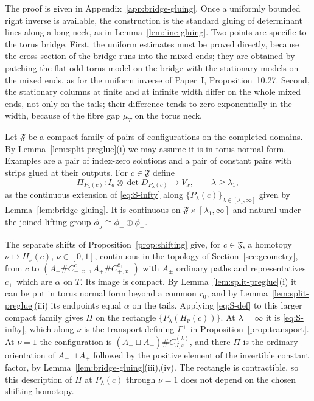 \documentclass[11pt]{amsart}
\theoremstyle{definition}
\theoremstyle{remark}
\theoremstyle{plain}
\numberwithin{equation}{section}
\begin{document}
The proof is given in Appendix~\ref{app:bridge-gluing}. Once a uniformly
bounded right inverse is available, the construction is the standard
gluing of determinant lines along a long neck, as in
Lemma~\ref{lem:line-gluing}. Two points are specific to the torus bridge.
First, the uniform estimates must be proved directly, because the
cross-section of the bridge runs into the mixed ends; they are obtained by
patching the flat odd-torus model on the bridge with the stationary models
on the mixed ends, as for the uniform inverse of Paper~I,
Proposition~10.27. Second, the stationary columns at finite and at infinite
width differ on the whole mixed ends, not only on the tails; their
difference tends to zero exponentially in the width, because of the fibre
gap $\mu_T$ on the torus neck.

Let $\mathfrak F$ be a compact family of pairs of configurations on the
completed domains. By Lemma~\ref{lem:split-preglue}(i) we may assume it
is in torus normal form. Examples are a pair of index-zero solutions
and a pair of constant pairs with strips glued at their outputs. For
$c\in\mathfrak F$ define
\begin{equation}\label{eq:S-def}
 \Pi_{P_\lambda(c)}:I_a\otimes\det D_{P_\lambda(c)}\longrightarrow V_x ,
 \qquad\lambda\ge\lambda_1,
\end{equation}
as the continuous extension of \eqref{eq:S-infty} along
$\{P_\lambda(c)\}_{\lambda\in[\lambda_1,\infty]}$ given by
Lemma~\ref{lem:bridge-gluing}. It is continuous on
$\mathfrak F\times[\lambda_1,\infty]$ and natural under the joined lifting
group $\phi_J\cong\phi_-\oplus\phi_+$.

The separate shifts of Proposition~\ref{prop:shifting} give, for
$c\in\mathfrak F$, a homotopy $\nu\mapsto H_\nu(c)$, $\nu\in[0,1]$, continuous in
the topology of Section~\ref{sec:geometry}, from $c$ to
$(A_-\#C^{c_-}_{-,x_-},A_+\#C^{c_+}_{+,x_+})$ with $A_\pm$ ordinary paths
and representatives $c_\pm$ which are $\alpha$ on $T$. Its image
is compact. By Lemma~\ref{lem:split-preglue}(i) it can be put in torus
normal form beyond a common $r_0$, and by
Lemma~\ref{lem:split-preglue}(iii) its endpoints equal $\alpha$ on the
tails. Applying \eqref{eq:S-def} to this larger compact family gives
$\Pi$ on the rectangle $\{P_\lambda(H_\nu(c))\}$. At $\lambda=\infty$ it is
\eqref{eq:S-infty}, which along $\nu$ is the transport defining
$\Gamma^\pm$ in Proposition~\ref{prop:transport}. At $\nu=1$ the
configuration is $(A_-\sqcup A_+)\#C^{(\lambda)}_{J,x}$, and there $\Pi$ is
the ordinary orientation of $A_-\sqcup A_+$ followed by the positive
element of the invertible constant factor, by
Lemma~\ref{lem:bridge-gluing}(iii),(iv). The rectangle is
contractible, so this description of $\Pi$ at $P_\lambda(c)$ through $\nu=1$
does not depend on the chosen shifting homotopy.
\end{document}
